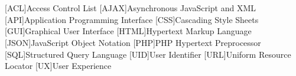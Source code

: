 \documentclass[
  11pt, %
  oneside, %
  american, %
  onehalfspacing, %
  liststotoc, %
  headsepline, %
  chapterinoneline, %
]{MastersDoctoralThesis} %
\author{Max \textsc{Mustermann}} %
\begin{document}
\frontmatter %

\pagestyle{plain} %

\sloppy





\cleardoublepage







{\hypersetup{linkcolor=black} %
  \tableofcontents %

  \listoffigures %

  \listoftables %

}


  
\chapter{\abbrevname}
\begin{acronym}[AAAAAA]
  [ACL]{Access Control List}
  [AJAX]{Asynchronous JavaScript and XML}
  [API]{Application Programming Interface}
  [CSS]{Cascading Style Sheets}
  [GUI]{Graphical User Interface}
  [HTML]{Hypertext Markup Language}
  [JSON]{JavaScript Object Notation}
  [PHP]{PHP Hypertext Preprocessor}
  [SQL]{Structured Query Language}
  [UID]{User Identifier}
  [URL]{Uniform Resource Locator}
  [UX]{User Experience}
\end{acronym}
\end{document}
